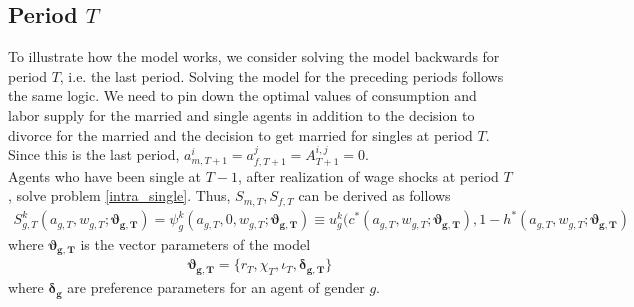 \subsection{Period $T$}
To illustrate how the model works, we consider solving the model backwards for period $T$, i.e. the last period. Solving the model for the preceding periods follows the same logic. We need to pin down the optimal values of consumption and labor supply for the married and single agents in addition to the decision to divorce for the married and the decision to get married for singles at period $T$. Since this is the last period, $a^i_{m, T+1} = a^j_{f, T+1} = A^{i,j}_{T+1} = 0$.  \\
Agents who have been single at $T-1$, after realization of wage shocks at period $T$, solve problem \eqref{intra_single}. Thus, $S_{m,T}, S_{f,T}$ can be derived as follows 
\begin{align*}
S_{g,T}^k(a_{g,T}, w_{g,T}; \bm{\vartheta_{g,T}}) = \psi_g^k(a_{g,T},0,  w_{g,T}; \bm{\vartheta_{g,T}}) \equiv u_g^k(c^*(a_{g,T}, w_{g,T}; \bm{\vartheta_{g,T}}), 1 -h^*(a_{g,T}, w_{g,T}; \bm{\vartheta_{g,T}})
\end{align*}
where $\bm{\vartheta_{g,T}}$ is the vector parameters of the model 
\begin{align*}
\bm{\vartheta_{g,T}} = \{ r_T, \chi_T, \iota_T, \bm{\delta_{g,T}}\}
\end{align*}
where $\bm{\delta_g}$ are preference parameters for an agent of gender $g$. 


